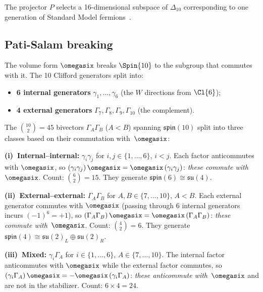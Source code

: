 The projector $P$ selects a 16-dimensional subspace of
$\Delta_{10}$ corresponding to one generation of Standard
Model fermions~\cite{Todorov2022}.

\subsection{Pati-Salam breaking}\label{sec:pati-salam}

The volume form $\omegasix$ breaks $\Spin{10}$ to the subgroup
that commutes with it.  The 10 Clifford generators split into:
\begin{itemize}
  \item \textbf{6 internal generators} $\gamma_1,\ldots,\gamma_6$
    (the $W$ directions from $\Cl{6}$);
  \item \textbf{4 external generators} $\Gamma_7,\Gamma_8,
    \Gamma_9,\Gamma_{10}$ (the complement).
\end{itemize}

The $\binom{10}{2} = 45$ bivectors $\Gamma_A\Gamma_B$ ($A<B$)
spanning $\mathfrak{spin}(10)$ split into three classes based on
their commutation with~$\omegasix$:

\medskip
\noindent\textbf{(i)~Internal--internal:}
$\gamma_i\gamma_j$ for $i,j\in\{1,\ldots,6\}$, $i<j$.
Each factor anticommutes with $\omegasix$, so
$(\gamma_i\gamma_j)\,\omegasix = \omegasix\,(\gamma_i\gamma_j)$:
\emph{these commute with~$\omegasix$}.
Count: $\binom{6}{2} = 15$.
They generate $\mathfrak{spin}(6)\cong\mathfrak{su}(4)$.

\medskip
\noindent\textbf{(ii)~External--external:}
$\Gamma_A\Gamma_B$ for $A,B\in\{7,\ldots,10\}$, $A<B$.
Each external generator commutes with $\omegasix$ (passing
through 6 internal generators incurs $(-1)^6 = +1$), so
$(\Gamma_A\Gamma_B)\,\omegasix = \omegasix\,(\Gamma_A\Gamma_B)$:
\emph{these commute with~$\omegasix$}.
Count: $\binom{4}{2} = 6$.
They generate $\mathfrak{spin}(4)\cong\mathfrak{su}(2)_L\oplus\mathfrak{su}(2)_R$.

\medskip
\noindent\textbf{(iii)~Mixed:}
$\gamma_i\Gamma_A$ for $i\in\{1,\ldots,6\}$, $A\in\{7,\ldots,10\}$.
The internal factor anticommutes with $\omegasix$ while the external
factor commutes, so
$(\gamma_i\Gamma_A)\,\omegasix = -\omegasix\,(\gamma_i\Gamma_A)$:
\emph{these anticommute with~$\omegasix$} and are not in the stabilizer.
Count: $6\times 4 = 24$.

